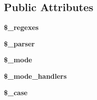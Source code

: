 \subsection*{Public Attributes}
\begin{DoxyCompactItemize}
\item 
\hypertarget{class_simple_lexer_a24815bcf9a657c90be430675208a6953}{
{\bfseries \$\_\-regexes}}
\label{class_simple_lexer_a24815bcf9a657c90be430675208a6953}

\item 
\hypertarget{class_simple_lexer_af133f26ff15129181faf9a7301c512a7}{
{\bfseries \$\_\-parser}}
\label{class_simple_lexer_af133f26ff15129181faf9a7301c512a7}

\item 
\hypertarget{class_simple_lexer_aa274a2329a9a24d6237fbef31e8e22c6}{
{\bfseries \$\_\-mode}}
\label{class_simple_lexer_aa274a2329a9a24d6237fbef31e8e22c6}

\item 
\hypertarget{class_simple_lexer_ae3750c0a0716b7a74bf1fc407339baf5}{
{\bfseries \$\_\-mode\_\-handlers}}
\label{class_simple_lexer_ae3750c0a0716b7a74bf1fc407339baf5}

\item 
\hypertarget{class_simple_lexer_a8ba2ee43e3c73a0b87c0579c803f4529}{
{\bfseries \$\_\-case}}
\label{class_simple_lexer_a8ba2ee43e3c73a0b87c0579c803f4529}

\end{DoxyCompactItemize}


